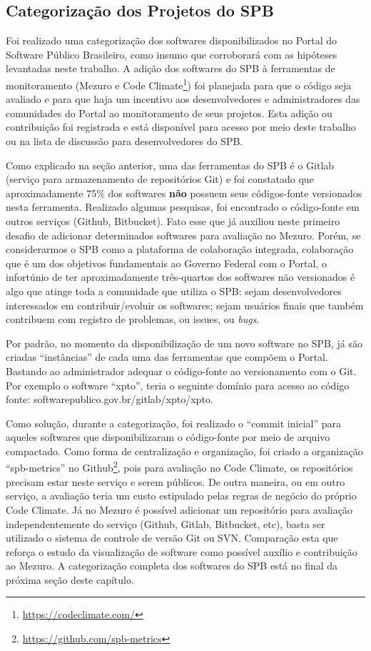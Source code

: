 \subsection{Categorização dos Projetos do SPB}

Foi realizado uma categorização dos softwares disponibilizados no Portal do
Software Público Brasileiro, como insumo que corroborará com as hipóteses
levantadas neste trabalho. A adição dos softwares do SPB à ferramentas de
monitoramento (Mezuro e Code Climate\footnote{\url{https://codeclimate.com/}})
foi planejada para que o código seja avaliado e para que haja um incentivo aos
desenvolvedores e administradores das comunidades do Portal ao monitoramento de
seus projetos. Esta adição ou contribuição foi registrada e está disponível
para acesso por meio deste trabalho ou na lista de discussão para
desenvolvedores do SPB.

Como explicado na seção anterior, uma das ferramentas do SPB é o Gitlab
(serviço para armazenamento de repositórios Git) e foi constatado que
aproximadamente 75\% dos softwares \textbf{não} possuem seus códigos-fonte
versionados nesta ferramenta. Realizado algumas pesquisas, foi encontrado o
código-fonte em outros serviços (Github, Bitbucket). Fato esse que já auxiliou
neste primeiro desafio de adicionar determinados softwares para avaliação no
Mezuro. Porém, se considerarmos o SPB como a plataforma de colaboração
integrada, colaboração que é um dos objetivos fundamentais ao Governo Federal
com o Portal, o infortúnio de ter aproximadamente três-quartos dos softwares
não versionados é algo que atinge toda a comunidade que utiliza o SPB: sejam
desenvolvedores interessados em contribuir/evoluir os softwares; sejam usuários
finais que também contribuem com registro de problemas, ou issues, ou \textit{bugs}.

Por padrão, no momento da disponibilização de um novo software no SPB, já são
criadas ``instâncias'' de cada uma das ferramentas que compõem o Portal. Bastando
ao administrador adequar o código-fonte ao versionamento com o Git. Por exemplo
o software ``xpto'', teria o seguinte domínio para acesso ao código fonte:
softwarepublico.gov.br/gitlab/xpto/xpto.

Como solução, durante a categorização, foi realizado o ``commit inicial'' para
aqueles softwares que disponibilizaram o código-fonte por meio de arquivo
compactado. Como forma de centralização e organização, foi criado a organização
``spb-metrics'' no Github\footnote{\url{https://github.com/spb-metrics}}, pois
para avaliação no Code Climate, os repositórios precisam estar neste serviço e
serem públicos. De outra maneira, ou em outro serviço, a avaliação teria um
custo estipulado pelas regras de negócio do próprio Code Climate. Já no Mezuro é
possível adicionar um repositório para avaliação independentemente do serviço
(Github, Gitlab, Bitbucket, etc), basta ser utilizado o sistema de controle de
versão Git ou SVN. Comparação esta que reforça o estudo da visualização de
software como possível auxílio e contribuição ao Mezuro. A categorização
completa dos softwares do SPB está no final da próxima seção deste capítulo.

